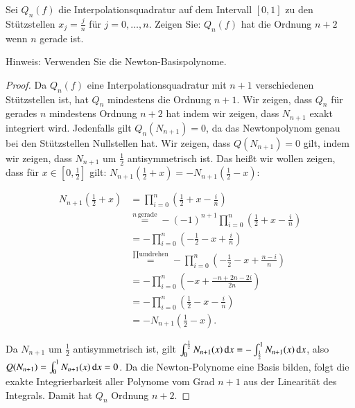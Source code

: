
\begin{exercise}
  Sei $Q_n(f)$ die Interpolationsquadratur auf dem Intervall $[0,1]$ zu den Stützstellen $x_j=\frac{j}{n}$ für $j=0,\dots,n$. Zeigen Sie: $Q_n(f)$ hat die Ordnung $n+2$ wenn $n$ gerade ist.

  Hinweis: Verwenden Sie die Newton-Basispolynome.
\end{exercise}
\begin{proof}
  Da $Q_n(f)$ eine Interpolationsquadratur mit $n+1$ verschiedenen Stützstellen ist, hat $Q_n$ mindestens die Ordnung $n+1$. Wir zeigen, dass $Q_n$ für gerades $n$ mindestens Ordnung $n+2$ hat indem wir zeigen, dass $N_{n+1}$ exakt integriert wird. Jedenfalls gilt $Q_n(N_{n+1})=0$, da das Newtonpolynom genau bei den Stützstellen Nullstellen hat. Wir zeigen, dass $Q(N_{n+1})=0$ gilt, indem wir zeigen, dass $N_{n+1}$ um $\frac{1}{2}$ antisymmetrisch ist. Das heißt wir wollen zeigen, dass für $x \in [0,\frac{1}{2}]$ gilt: $N_{n+1}(\frac{1}{2}+x)=-N_{n+1}(\frac{1}{2}-x)$:

  \begin{equation*}
    \begin{split}
      N_{n+1}\left(\frac{1}{2}+x\right)
      &=\prod_{i=0}^n{\left(\frac{1}{2}+x - \frac{i}{n}\right)} \\
      &\stackrel{n \, \text{gerade}}{=} -{(-1)}^{n+1} \prod_{i=0}^n{\left(\frac{1}{2}+x - \frac{i}{n}\right)} \\
      &=-\prod_{i=0}^n{\left(-\frac{1}{2}-x + \frac{i}{n}\right)} \\
      &\stackrel{\prod \text{umdrehen}}{=} -\prod_{i=0}^n{\left(-\frac{1}{2}-x + \frac{n-i}{n}\right)} \\
      &=-\prod_{i=0}^n{\left(-x + \frac{-n+2n-2i}{2n}\right)} \\
      &=-\prod_{i=0}^n{\left(\frac{1}{2}-x - \frac{i}{n}\right)} \\
      &=-N_{n+1}\left(\frac{1}{2}-x\right).
    \end{split}
  \end{equation*}

  Da $N_{n+1}$ um $\frac{1}{2}$ antisymmetrisch ist, gilt $\int_0^{\frac{1}{2}}{N_{n+1}(x) \dif x}=-\int_{\frac{1}{2}}^1{N_{n+1}(x) \dif x}$, also $Q(N_{n+1})=\int_0^1{N_{n+1}(x) \dif x} = 0$. Da die Newton-Polynome eine Basis bilden, folgt die exakte Integrierbarkeit aller Polynome vom Grad $n+1$ aus der Linearität des Integrals. Damit hat $Q_n$ Ordnung $n+2$.
\end{proof}
